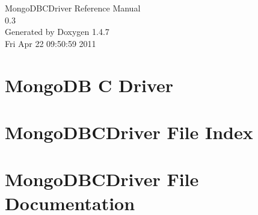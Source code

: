 \documentclass[a4paper]{book}
\begin{document}
\begin{titlepage}
\vspace*{7cm}
\begin{center}
{\Large Mongo\-DBCDriver Reference Manual\\[1ex]\large 0.3 }\\
\vspace*{1cm}
{\large Generated by Doxygen 1.4.7}\\
\vspace*{0.5cm}
{\small Fri Apr 22 09:50:59 2011}\\
\end{center}
\end{titlepage}
\clearemptydoublepage
{}
\tableofcontents
\clearemptydoublepage
{}
\chapter{Mongo\-DB C Driver }
\label{index}\hypertarget{index}{}
\chapter{Mongo\-DBCDriver File Index}

\chapter{Mongo\-DBCDriver File Documentation}







\printindex
\end{document}
